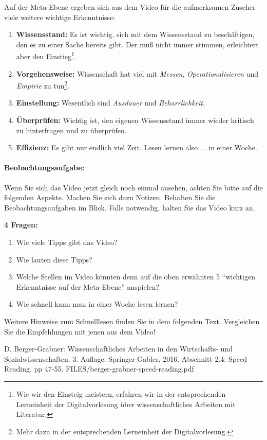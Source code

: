 Auf der Meta-Ebene ergeben sich aus dem Video für die aufmerksamen Zuseher 
viele weitere wichtige Erkenntnisse: 
\begin{enumerate}
\item \textbf{Wissensstand:} Es ist wichtig, sich mit dem Wissensstand zu beschäfti\-gen, den es zu einer
Sache bereits gibt. Der muß nicht immer stimmen, erleichtert aber den 
Einstieg\footnote{Wie wir den Einsteig meistern, erfahren wir in der 
entsprechenden Lerneinheit der Digitalvorlesung über 
wissenschaftliches Arbeiten mit Literatur.}.
\item \textbf{Vorgehensweise:} 
Wissenschaft hat viel mit \textit{Messen}, \textit{Operationalisieren} und \textit{Empirie} zu 
tun\footnote{Mehr dazu in der entsprechenden Lerneinheit der Digitalvorlesung.}.
\item \textbf{Einstellung:} Wesentlich sind \textit{Ausdauer} und \textit{Beharrlichkeit}.
\item \textbf{Überprüfen:} Wichtig ist, den eigenen Wissensstand immer wieder kritisch zu hinterfragen und
zu überprüfen.
\item \textbf{Effizienz:} Es gibt nur endlich viel Zeit. Lesen lernen also ... in einer Woche.
\end{enumerate}


\paragraph{Beobachtungsaufgabe:} Wenn Sie sich das Video jetzt gleich noch einmal ansehen, achten Sie bitte
auf die folgenden Aspekte. Machen Sie sich dazu Notizen. Behalten Sie die Beobachtungsaufgaben im Blick.
Falls notwendig, halten Sie das Video kurz an.

\textbf{4 Fragen:}
\begin{enumerate}
\item Wie viele Tipps gibt das Video?
\item Wie lauten diese Tipps?
\item Welche Stellen im Video könnten denn auf die oben erwähnten 5 \enquote{wichtigen Erkenntnisse auf
der Meta-Ebene}
anspielen?
\item Wie schnell kann man in einer Woche lesen lernen?
\end{enumerate}


Weitere Hinweise zum Schnelllesen finden Sie in dem folgenden Text. Vergleichen Sie die
Empfehlungen mit jenen aus dem Video!




{D. Berger-Grabner: Wissenschaftliches Arbeiten in den Wirtschafts- und Sozialwissenschaften.
3. Auflage. Springer-Gabler, 2016.
Abschnitt 2.4: Speed Reading.
pp 47-55.}
{FILES/berger-grabner-speed-reading.pdf}
{}

